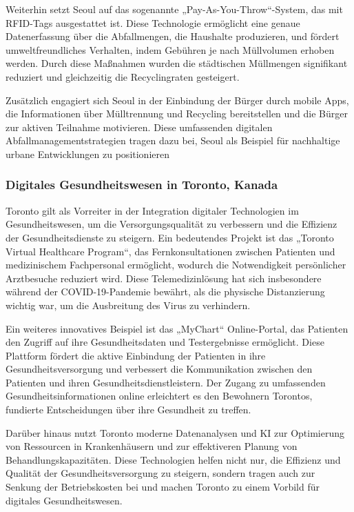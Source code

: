 \documentclass[conference,compsoc,final,a4paper, onecolumn, 11pt]{IEEEtran}
\begin{document}
Weiterhin setzt Seoul auf das sogenannte „Pay-As-You-Throw“-System, das mit RFID-Tags ausgestattet ist. 
Diese Technologie ermöglicht eine genaue Datenerfassung über die Abfallmengen, die Haushalte produzieren, und fördert umweltfreundliches Verhalten, indem Gebühren je nach Müllvolumen erhoben werden. \autocite{noauthor_dem_nodate}
Durch diese Maßnahmen wurden die städtischen Müllmengen signifikant reduziert und gleichzeitig die Recyclingraten gesteigert.

Zusätzlich engagiert sich Seoul in der Einbindung der Bürger durch mobile Apps, die Informationen über Mülltrennung und Recycling bereitstellen und die Bürger zur aktiven Teilnahme motivieren. \autocite{infosperber_von_2024}
Diese umfassenden digitalen Abfallmanagementstrategien tragen dazu bei, Seoul als Beispiel für nachhaltige urbane Entwicklungen zu positionieren


\subsubsection{Digitales Gesundheitswesen in Toronto, Kanada}
Toronto gilt als Vorreiter in der Integration digitaler Technologien im Gesundheitswesen, um die Versorgungsqualität zu verbessern und die Effizienz der Gesundheitsdienste zu steigern. 
Ein bedeutendes Projekt ist das „Toronto Virtual Healthcare Program“, das Fernkonsultationen zwischen Patienten und medizinischem Fachpersonal ermöglicht, wodurch die Notwendigkeit persönlicher Arztbesuche reduziert wird. \autocite{noauthor_virtual_2021}
Diese Telemedizinlösung hat sich insbesondere während der COVID-19-Pandemie bewährt, als die physische Distanzierung wichtig war, um die Ausbreitung des Virus zu verhindern.

Ein weiteres innovatives Beispiel ist das „MyChart“ Online-Portal, das Patienten den Zugriff auf ihre Gesundheitsdaten und Testergebnisse ermöglicht. 
Diese Plattform fördert die aktive Einbindung der Patienten in ihre Gesundheitsversorgung und verbessert die Kommunikation zwischen den Patienten und ihren Gesundheitsdienstleistern. \autocite{noauthor_kanada_2013} 
Der Zugang zu umfassenden Gesundheitsinformationen online erleichtert es den Bewohnern Torontos, fundierte Entscheidungen über ihre Gesundheit zu treffen.

Darüber hinaus nutzt Toronto moderne Datenanalysen und \ac{KI} zur Optimierung von Ressourcen in Krankenhäusern und zur effektiveren Planung von Behandlungskapazitäten. \autocite{noauthor_kanada_2013}
Diese Technologien helfen nicht nur, die Effizienz und Qualität der Gesundheitsversorgung zu steigern, sondern tragen auch zur Senkung der Betriebskosten bei und machen Toronto zu einem Vorbild für digitales Gesundheitswesen.
\end{document}
